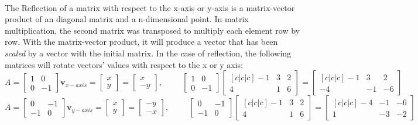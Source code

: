 \documentclass[11pt]{article}
\begin{document}
\paragraph[Reflection]{} The Reflection of a matrix with respect to the x-axis or y-axis is a matrix-vector product of an diagonal matrix and a n-dimensional point. In matrix multiplication, the second matrix was transposed to multiply each element row by row. With the matrix-vector product, it will produce a vector that has been \textit{scaled} by a vector with the initial matrix. In the case of reflection, the following matrices will rotate vectors' values with respect to the x or y axis:
{ \small
	\begin{equation}\label{equ:XReflection}
	A=
		\begin{bmatrix}
		1 & 0\\
		0 & -1 
		\end{bmatrix}
	\textbf{v}_{x-axis}=
		\begin{bmatrix}
		x\\
		y
		\end{bmatrix}
	=	
		\begin{bmatrix}
		x\\
		-y
		\end{bmatrix}
	,
		\hspace{1cm}
		\begin{bmatrix}
		1 & 0\\
		0 & -1 
		\end{bmatrix}
		\begin{bmatrix}[c|c|c]
		-1 & 3 & 2\\
		4 & 1 & 6
		\end{bmatrix}
	=
		\begin{bmatrix}[c|c|c]
		-1 &  3 &  2\\
		-4 & -1 & -6
		\end{bmatrix}
\end{equation}
\begin{equation}\label{equ:YReflection}
	A=
		\begin{bmatrix}
		0 & -1\\
		-1 & 0 
		\end{bmatrix}
	\textbf{v}_{y-axis}=
		\begin{bmatrix}
		x\\
		y
		\end{bmatrix}
	=	
		\begin{bmatrix}
		-y\\
		-x
		\end{bmatrix}
	,
		\hspace{1cm}
		\begin{bmatrix}
		 0 &-1\\
		-1 & 0
		\end{bmatrix}
		\begin{bmatrix}[c|c|c]
		-1 & 3 & 2\\
		4 & 1 & 6
		\end{bmatrix}
	=
		\begin{bmatrix}[c|c|c]
		-4 & -1 & -6\\
		 1 & -3 & -2
		\end{bmatrix}
	\end{equation}
}
\end{document}
